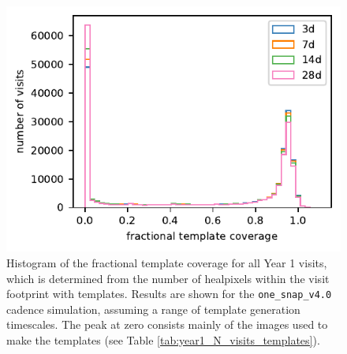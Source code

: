 \documentclass[preprintm,linenumbers]{aastex631}
\newcommand{\baseline}{\texttt{one\_snap\_v4.0}\xspace}
\begin{document}
  		
		\begin{figure}
			\centering
			\includegraphics{results/fractional_template_coverage_first_year_one_snap_v4_0_10yrs_db_noDD_noTwi.pdf}
			\caption{Histogram of the fractional template coverage for all Year 1 visits, which is determined from the number of healpixels within the visit footprint with templates.
				Results are shown for the \baseline cadence simulation, assuming a range of template generation timescales.
				The peak at zero consists mainly of the images used to make the templates (see Table \ref{tab:year1_N_visits_templates}).
			}
			\label{fig:fractional_template_coverage}
		\end{figure}
\end{document}
